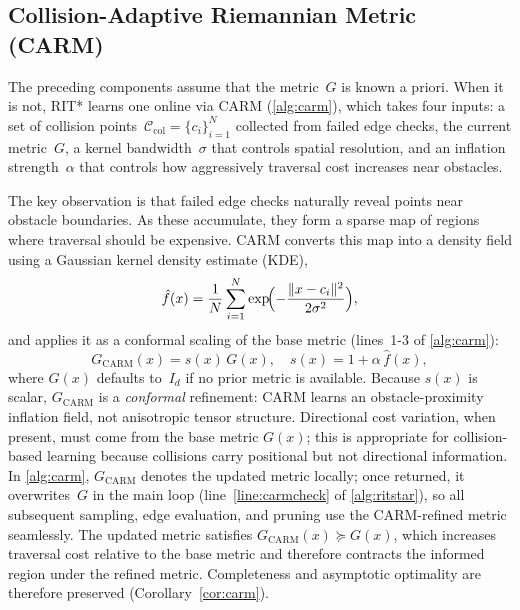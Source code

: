 \documentclass[journal]{IEEEtran}
\newcommand{\greenrev}[1]{#1}%
\begin{document}
\subsection{Collision-Adaptive Riemannian Metric (CARM)}\label{sec:carm}

The preceding components assume that the metric~$G$ is known a priori.
When it is not, RIT* learns one online via CARM
(\cref{alg:carm}), which takes four inputs: a set of collision
points~$\mathcal{C}_{\mathrm{col}} = \{c_i\}_{i=1}^{N}$
collected from failed edge checks, the current
metric~$G$, a kernel bandwidth~$\sigma$ that controls
spatial resolution, and an inflation strength~$\alpha$ that
controls how aggressively traversal cost increases near
obstacles.

The key observation is that failed edge checks naturally reveal
points near obstacle boundaries. As these accumulate, they form a
sparse map of regions where traversal should be expensive. CARM
converts this map into a density field using a Gaussian kernel
density estimate (KDE),
\begin{equation}\label{eq:kde}
  \hat{f}(x) = \frac{1}{N}\sum_{i=1}^{N}
  \exp\!\Bigl(-\frac{\|x-c_i\|^2}{2\sigma^2}\Bigr),
\end{equation}
and applies it as a conformal scaling of the base metric
(lines~1-3 of \cref{alg:carm}):
\begin{equation}\label{eq:carm}
  G_{\mathrm{CARM}}(x) = s(x)\, G(x), \quad
  s(x) = 1 + \alpha\, \hat{f}(x),
\end{equation}
where $G(x)$ defaults to~$I_d$ if no prior metric is available.
Because $s(x)$ is scalar, $G_{\mathrm{CARM}}$ is a
\emph{conformal} refinement: CARM learns an obstacle-proximity
inflation field, not anisotropic tensor structure. Directional cost
variation, when present, must come from the base metric $G(x)$; this
is appropriate for collision-based learning because collisions carry
positional but not directional information.
In \cref{alg:carm}, $G_{\mathrm{CARM}}$ denotes the updated
metric locally; once returned, it overwrites~$G$ in the main
loop (line~\ref{line:carmcheck} of \cref{alg:ritstar}), so all subsequent
sampling, edge evaluation, and pruning use the CARM-refined
metric seamlessly. The updated metric satisfies
$G_{\mathrm{CARM}}(x) \succeq G(x)$, \greenrev{which increases traversal cost relative to the base metric and therefore contracts the informed region under the refined metric.} Completeness
and asymptotic optimality are therefore preserved
(Corollary~\ref{cor:carm}).
\end{document}
